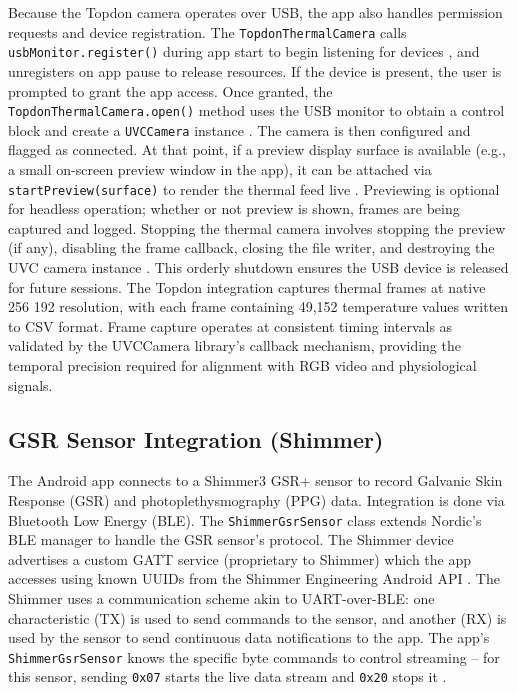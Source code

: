 Because the Topdon camera operates over USB, the app also handles permission requests and device registration. The \texttt{TopdonThermalCamera} calls \texttt{usbMonitor.register()} during app start to begin listening for devices \cite{ref16}, and unregisters on app pause to release resources. If the device is present, the user is prompted to grant the app access. Once granted, the \texttt{TopdonThermalCamera.open()} method uses the USB monitor to obtain a control block and create a \texttt{UVCCamera} instance \cite{ref16}. The camera is then configured and flagged as connected. At that point, if a preview display surface is available (e.g., a small on-screen preview window in the app), it can be attached via \texttt{startPreview(surface)} to render the thermal feed live \cite{ref16}. Previewing is optional for headless operation; whether or not preview is shown, frames are being captured and logged. Stopping the thermal camera involves stopping the preview (if any), disabling the frame callback, closing the file writer, and destroying the UVC camera instance \cite{ref16}. This orderly shutdown ensures the USB device is released for future sessions. The Topdon integration captures thermal frames at native 256\,\texttimes\,192 resolution, with each frame containing 49{,}152 temperature values written to CSV format. Frame capture operates at consistent timing intervals as validated by the UVCCamera library's callback mechanism, providing the temporal precision required for alignment with RGB video and physiological signals.

\subsection{GSR Sensor Integration (Shimmer)}\label{sec:4-2-2}
The Android app connects to a Shimmer3 GSR+ sensor to record Galvanic Skin Response (GSR) and photoplethysmography (PPG) data. Integration is done via Bluetooth Low Energy (BLE). The \texttt{ShimmerGsrSensor} class extends Nordic's BLE manager to handle the GSR sensor's protocol. The Shimmer device advertises a custom GATT service (proprietary to Shimmer) which the app accesses using known UUIDs from the Shimmer Engineering Android API \cite{ref15}. The Shimmer uses a communication scheme akin to UART-over-BLE: one characteristic (TX) is used to send commands to the sensor, and another (RX) is used by the sensor to send continuous data notifications to the app. The app's \texttt{ShimmerGsrSensor} knows the specific byte commands to control streaming -- for this sensor, sending \texttt{0x07} starts the live data stream and \texttt{0x20} stops it \cite{ref15}.

